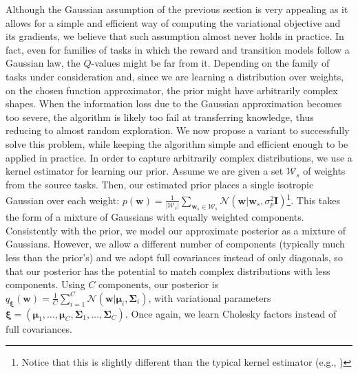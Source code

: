 \documentclass{article}
\newcommand{\abs}[1]{\left\lvert #1 \right\rvert}
\begin{document}
Although the Gaussian assumption of the previous section is very appealing as it allows for a simple and efficient way of computing the variational objective and its gradients, we believe that such assumption almost never holds in practice. In fact, even for families of tasks in which the reward and transition models follow a Gaussian law, the $Q$-values might be far from it. Depending on the family of tasks under consideration and, since we are learning a distribution over weights, on the chosen function approximator, the prior might have arbitrarily complex shapes. When the information loss due to the Gaussian approximation becomes too severe, the algorithm is likely too fail at transferring knowledge, thus reducing to almost random exploration. We now propose a variant to successfully solve this problem, while keeping the algorithm simple and efficient enough to be applied in practice. In order to capture arbitrarily complex distributions, we use a kernel estimator \cite{}\todo{} for learning our prior. Assume we are given a set $\mathcal{W}_s$ of weights from the source tasks. Then, our estimated prior places a single isotropic Gaussian over each weight: $p(\bm{w}) = \frac{1}{\abs{\mathcal{W}_s}}\sum_{\bm{w}_s \in \mathcal{W}_s}\mathcal{N}(\bm{w}|\bm{w}_s,\sigma_p^2\bm{I})$\footnote{Notice that this is slightly different than the typical kernel estimator (e.g., \cite{})}. This takes the form of a mixture of Gaussians with equally weighted components. Consistently with the prior, we model our approximate posterior as a mixture of Gaussians. However, we allow a different number of components (typically much less than the prior's) and we adopt full covariances instead of only diagonals, so that our posterior has the potential to match complex distributions with less components. Using $C$ components, our posterior is $q_{\bm{\xi}}(\bm{w}) = \frac{1}{C}\sum_{i=1}^C\mathcal{N}(\bm{w}|\bm{\mu}_i,\bm{\Sigma}_i)$, with variational parameters $\bm{\xi} = (\bm{\mu}_1,\dots,\bm{\mu}_C,\bm{\Sigma}_1,\dots,\bm{\Sigma}_C)$. Once again, we learn Cholesky factors instead of full covariances.
\end{document}
